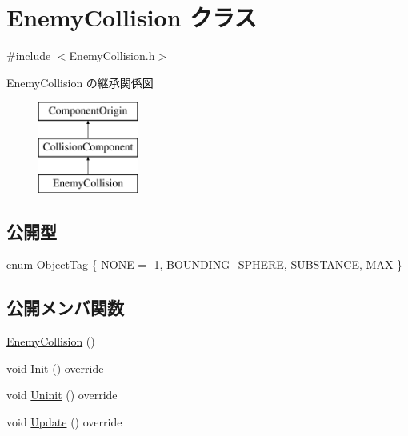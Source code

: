 \hypertarget{class_enemy_collision}{}\section{Enemy\+Collision クラス}
\label{class_enemy_collision}


{\ttfamily \#include $<$Enemy\+Collision.\+h$>$}

Enemy\+Collision の継承関係図\begin{figure}[H]
\begin{center}
\leavevmode
\includegraphics[height=3.000000cm]{class_enemy_collision}
\end{center}
\end{figure}
\subsection*{公開型}
\begin{DoxyCompactItemize}
\item 
enum \mbox{\hyperlink{class_enemy_collision_a8423c2c1dce9ba8ab2ba9bed82ee4843}{Object\+Tag}} \{ \mbox{\hyperlink{class_enemy_collision_a8423c2c1dce9ba8ab2ba9bed82ee4843a54855bb90bae23d3697d74e0b20462a2}{N\+O\+NE}} = -\/1, 
\mbox{\hyperlink{class_enemy_collision_a8423c2c1dce9ba8ab2ba9bed82ee4843a327f14f5b5cd28a3e605ff4f7066e8ce}{B\+O\+U\+N\+D\+I\+N\+G\+\_\+\+S\+P\+H\+E\+RE}}, 
\mbox{\hyperlink{class_enemy_collision_a8423c2c1dce9ba8ab2ba9bed82ee4843a8c9cd2ea0a1628d412fc501c91541ab0}{S\+U\+B\+S\+T\+A\+N\+CE}}, 
\mbox{\hyperlink{class_enemy_collision_a8423c2c1dce9ba8ab2ba9bed82ee4843a4283c301ae1d9317453c36d5923f7136}{M\+AX}}
 \}
\end{DoxyCompactItemize}
\subsection*{公開メンバ関数}
\begin{DoxyCompactItemize}
\item 
\mbox{\hyperlink{class_enemy_collision_ae81d47621dafebb16bc7c6a68388dacd}{Enemy\+Collision}} ()
\item 
void \mbox{\hyperlink{class_enemy_collision_ae5c000a30c8c4a023dd0c8e658def772}{Init}} () override
\item 
void \mbox{\hyperlink{class_enemy_collision_a2a194c606fd162db803c70c6fed9b9e4}{Uninit}} () override
\item 
void \mbox{\hyperlink{class_enemy_collision_ab54133504d867c6d2070d2f3854a0aaf}{Update}} () override
\end{DoxyCompactItemize}


